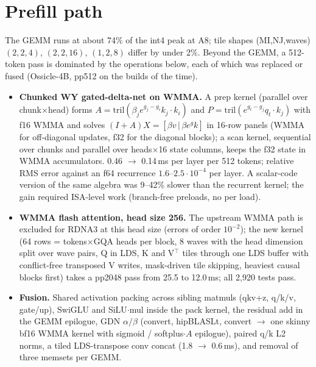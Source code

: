 \documentclass[10.5pt,a4paper]{article}
\newcommand{\tx}[1]{\texttt{\detokenize{#1}}}
\begin{document}
\section{Prefill path}

The GEMM runs at about 74\% of the int4 peak at A8; tile shapes (MI,NJ,waves) $(2,2,4)$, $(2,2,16)$, $(1,2,8)$ differ by under 2\%. Beyond the GEMM, a 512-token \tx{fast} pass is dominated by the operations below, each of which was
replaced or fused (Ossicle-4B, pp512 on the builds of the time).

\begin{itemize}
\item \textbf{Chunked WY gated-delta-net on WMMA.} A prep kernel (parallel over chunk$\times$head) forms $A=\mathrm{tril}(\beta_je^{g_j-g_i}k_j\!\cdot\!k_i)$ and $P=\mathrm{tril}(e^{g_t-g_j}q_t\!\cdot\!k_j)$ with f16 WMMA and solves
$(I+A)X=[\beta v\,|\,\beta e^{g}k]$ in 16-row panels (WMMA for off-diagonal updates, f32 for the diagonal blocks); a scan kernel, sequential over chunks and parallel over heads$\times$16 state columns, keeps the f32 state in WMMA
accumulators. 0.46 $\to$ 0.14\,ms per layer per 512 tokens; relative RMS error against an f64 recurrence $1.6$--$2.5\cdot10^{-4}$ per layer. A scalar-code version of the same algebra was 9--42\% slower than the recurrent kernel; the gain
required ISA-level work (branch-free preloads, no \tx{vmcnt(0)} per load).
\item \textbf{WMMA flash attention, head size 256.} The upstream WMMA path is excluded for RDNA3 at this head size (errors of order $10^{-2}$); the new kernel (64 rows = tokens$\times$GQA heads per block, 8 waves with the head dimension
split over wave pairs, Q in LDS, K and V$^{\top}$ tiles through one LDS buffer with conflict-free transposed V writes, mask-driven tile skipping, heaviest causal blocks first) takes a pp2048 pass from 25.5 to 12.0\,ms; all 2{,}920
\tx{FLASH_ATTN_EXT} tests pass.
\item \textbf{Fusion.} Shared activation packing across sibling matmuls (qkv+z, q/k/v, gate/up), SwiGLU and SiLU$\cdot$mul inside the pack kernel, the residual add in the GEMM epilogue, GDN $\alpha/\beta$ (convert, hipBLASLt, convert $\to$ one skinny bf16 WMMA
kernel with sigmoid / softplus$\cdot A$ epilogue), paired q/k L2 norms, a tiled LDS-transpose conv concat (1.8 $\to$ 0.6\,ms), and removal of three memsets per GEMM.
\end{itemize}
\end{document}
